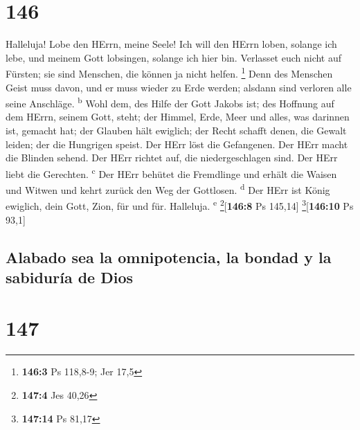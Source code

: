 \hypertarget{section-145}{%
\section{146}\label{section-145}}

 Halleluja! Lobe den HErrn, meine Seele! 
Ich will den HErrn loben, solange ich lebe, und meinem Gott lobsingen,
solange ich hier bin.  Verlasset euch nicht auf Fürsten;
sie sind Menschen, die können ja nicht helfen. \footnote{\textbf{146:3}
  Ps 118,8-9; Jer 17,5}  Denn des Menschen Geist muss
davon, und er muss wieder zu Erde werden; alsdann sind verloren alle
seine Anschläge. \textsuperscript{b}  Wohl dem, des Hilfe
der Gott Jakobs ist; des Hoffnung auf dem HErrn, seinem Gott, steht;
 der Himmel, Erde, Meer und alles, was darinnen ist,
gemacht hat; der Glauben hält ewiglich;  der Recht schafft
denen, die Gewalt leiden; der die Hungrigen speist. Der HErr löst die
Gefangenen.  Der HErr macht die Blinden sehend. Der HErr
richtet auf, die niedergeschlagen sind. Der HErr liebt die Gerechten.
\textsuperscript{c}  Der HErr behütet die Fremdlinge und
erhält die Waisen und Witwen und kehrt zurück den Weg der Gottlosen.
\textsuperscript{d}  Der HErr ist König ewiglich, dein
Gott, Zion, für und für. Halleluja. \textsuperscript{e}
\footnote{\textbf{147:4} Jes 40,26}{[}\textbf{146:8} Ps 145,14{]}
\footnote{\textbf{147:14} Ps 81,17}{[}\textbf{146:10} Ps 93,1{]}

\hypertarget{alabado-sea-la-omnipotencia-la-bondad-y-la-sabiduruxeda-de-dios}{%
\subsection{Alabado sea la omnipotencia, la bondad y la sabiduría de
Dios}\label{alabado-sea-la-omnipotencia-la-bondad-y-la-sabiduruxeda-de-dios}}

\hypertarget{section-146}{%
\section{147}\label{section-146}}

